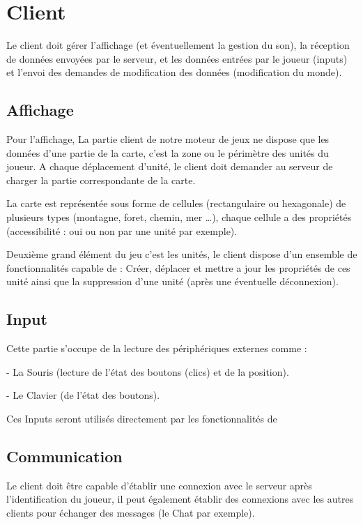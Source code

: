 \documentclass[a4paper,10pt]{report}
\begin{document}
    \section{Client}

      Le client doit gérer l'affichage (et éventuellement la gestion du son), la réception de données envoyées par le serveur, et les données entrées par le joueur (inputs) et l'envoi des demandes de modification des données (modification du monde).

      \subsection{Affichage}

	Pour l’affichage, La partie client de notre moteur de jeux ne dispose que les données d’une partie de la carte, c’est la zone ou le périmètre des unités du joueur. A chaque déplacement d’unité, le client doit demander au serveur de charger la partie  correspondante de la carte.

	La carte est représentée sous forme de cellules (rectangulaire ou hexagonale) de plusieurs types (montagne, foret, chemin, mer …), chaque cellule a des propriétés (accessibilité : oui ou non par une unité par exemple).

	Deuxième grand élément du jeu c’est les unités, le client dispose d’un ensemble de fonctionnalités capable de : Créer, déplacer et mettre a jour les propriétés de ces unité ainsi que la suppression d’une unité (après une éventuelle déconnexion).

      \subsection{Input}

	Cette partie s'occupe de la lecture des périphériques externes comme :

	- La Souris (lecture de l'état des boutons (clics) et de la position).

	- Le Clavier (de l'état des boutons).

	Ces Inputs seront utilisés directement par les fonctionnalités de

      \subsection{Communication}

	Le client doit être capable d’établir une connexion avec le serveur après l’identification du joueur, il peut également établir des connexions avec les autres clients pour échanger des messages (le Chat par exemple).
\end{document}
